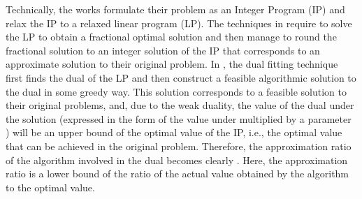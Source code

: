 \documentclass[10pt,journal,compsoc]{IEEEtran}
\begin{document}
Technically, the works \cite{Jain11a,Jain,Lucier,Bodik,Azar} formulate their problem as an Integer Program (IP) and relax the IP to a relaxed linear program (LP). The techniques in \cite{Jain11a,Bodik} require to solve the LP to obtain a fractional optimal solution and then manage to round the fractional solution to an integer solution of the IP that corresponds to an approximate solution to their original problem. In \cite{Jain,Lucier,Azar}, the dual fitting technique first finds the dual of the LP and then construct a feasible algorithmic solution  to the dual in some greedy way. This solution corresponds to a feasible solution  to their original problems, and, due to the weak duality, the value of the dual under the solution  (expressed in the form of the value under  multiplied by a parameter ) will be an upper bound of the optimal value of the IP, i.e., the optimal value that can be achieved in the original problem. Therefore, the approximation ratio of the algorithm involved in the dual becomes clearly  . Here, the approximation ratio is a lower bound of the ratio of the actual value obtained by the algorithm to the optimal value.
\end{document}
